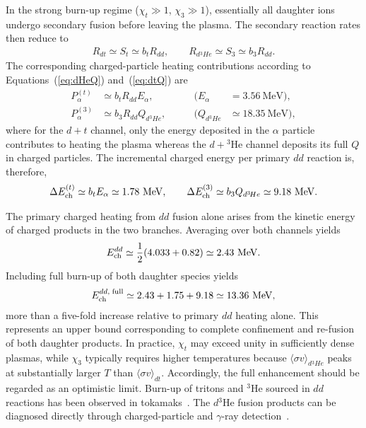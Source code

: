 \documentclass[particles,article,accept,pdftex,moreauthors]{Definitions/mdpi}
\begin{document}
In the strong burn-up regime ($\chi_t\gg1$, $\chi_3\gg1$), essentially all daughter ions undergo secondary fusion before leaving the plasma. 
The secondary reaction rates then reduce to
\begin{align}
R_{dt} \simeq S_t \simeq b_t R_{dd},\qquad
R_{d{}^3\!He} \simeq S_3 \simeq b_3 R_{dd}.
\end{align}
The corresponding charged-particle heating contributions according to Equations~(\ref{eq:dHeQ}) and~(\ref{eq:dtQ}) are
\begin{align}
P_{\alpha}^{(t)} &\simeq b_t R_{dd} E_\alpha, 
\qquad &(E_\alpha &= 3.56~\mathrm{MeV}), \\
P_{\alpha}^{(3)} &\simeq b_3 R_{dd} Q_{d{}^3\!He},
\qquad &(Q_{d{}^3\!He}&\simeq 18.35~\mathrm{MeV}),
\end{align}
where for the $d+t$ channel, only the energy deposited in the $\alpha$ particle contributes to heating the plasma whereas the $d+{}^3\mathrm{He}$ channel deposits its full $Q$ in charged particles. The incremental charged energy per primary $dd$ reaction is, therefore,
\begin{align}
\Delta E_{\rm ch}^{(t)}
\simeq b_t E_\alpha
\simeq 1.78~\mathrm{MeV},\qquad
\Delta E_{\rm ch}^{(3)}
\simeq b_3 Q_{d{}^3\!He}
\simeq 9.18~\mathrm{MeV}.
\end{align}

The primary charged heating from $dd$ fusion alone arises from the kinetic energy of charged products in the two branches. Averaging over both channels yields
\begin{align}
E_{\rm ch}^{dd}
\simeq \frac12(4.033 + 0.82)
\simeq 2.43~\mathrm{MeV}.
\end{align}
Including full burn-up of both daughter species yields
\begin{align}
E_{\rm ch}^{dd,\;{\rm full}}
\simeq 2.43 + 1.75 + 9.18
\simeq 13.36~\mathrm{MeV},
\end{align}
more than a five-fold increase relative to primary $dd$ heating alone. This represents an upper bound corresponding to complete confinement and re-fusion of both daughter products. In practice, $\chi_t$ may exceed unity in sufficiently dense plasmas, while $\chi_3$ typically requires higher temperatures because $\langle\sigma v\rangle_{d{}^3\!He}$ peaks at substantially larger $T$ than $\langle\sigma v\rangle_{dt}$. Accordingly, the full enhancement should be regarded as an optimistic limit. Burn-up of tritons and ${}^3\mathrm{He}$ sourced in $dd$ reactions has been observed in tokamaks~\cite{heidbrink1983}. The $d{}^3\mathrm{He}$ fusion products can be diagnosed directly through charged-particle and $\gamma$-ray detection~\cite{sharapov2016}.
\end{document}
